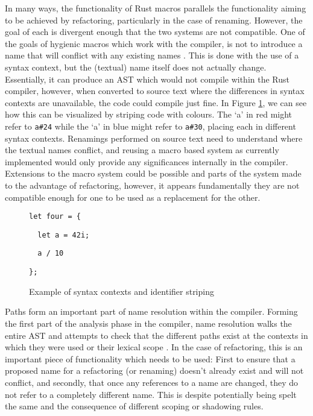 In many ways, the functionality of Rust macros parallels the functionality aiming to be achieved by refactoring, particularly in the case of renaming. However, the goal of each is divergent enough that the two systems are not compatible. One of the goals of hygienic macros which work with the compiler, is not to introduce a name that will conflict with any existing names \cite{keep15}. This is done with the use of a syntax context, but the (textual) name itself does not actually change. Essentially, it can produce an AST which would not compile within the Rust compiler, however, when converted to source text where the differences in syntax contexts are unavailable, the code could compile just fine. In Figure \ref{Fig:striping}, we can see how this can be visualized by striping code with colours. The `a' in red might refer to {\verb|a#24|} while the `a' in blue might refer to {\verb|a#30|}, placing each in different syntax contexts. Renamings performed on source text need to understand where the textual names conflict, and reusing a macro based system as currently implemented would only provide any significances internally in the compiler. Extensions to the macro system could be possible and parts of the system made to the advantage of refactoring, however, it appears fundamentally they are not compatible enough for one to be used as a replacement for the other.

\begin{figure}[h]
{\color{blue}
\verb|let four = {|
}

{\color{red}

\verb|  let a = 42i;|
}

{
\color{blue}

\verb|  a / 10|
}

{\color{red}

\verb|};|
}

\caption{Example of syntax contexts and identifier striping}
\label{Fig:striping}
\end{figure}

Paths form an important part of name resolution within the compiler. Forming the first part of the analysis phase in the compiler, name resolution walks the entire AST and attempts to check that the different paths exist at the contexts in which they were used or their lexical scope \cite{driver15}. In the case of refactoring, this is an important piece of functionality which needs to be used: First to ensure that a proposed name for a refactoring (or renaming) doesn't already exist and will not conflict, and secondly, that once any references to a name are changed, they do not refer to a completely different name. This is despite potentially being spelt the same and the consequence of different scoping or shadowing rules.

